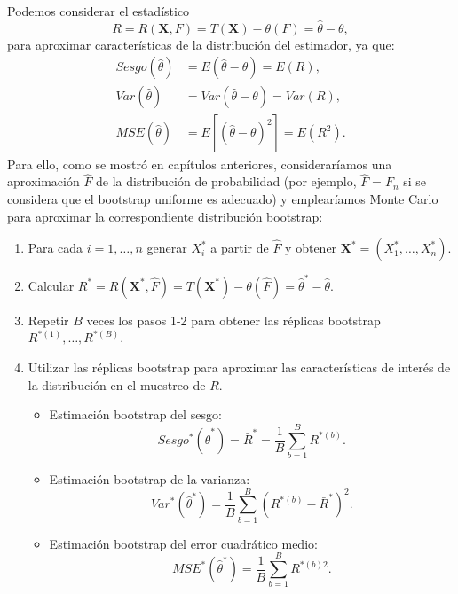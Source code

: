 \documentclass[
]{book}
\theoremstyle{break}
\theoremstyle{nonumberplain}
\begin{document}
Podemos considerar el estadístico
\[R=R\left( \mathbf{X}, F \right) = T\left( \mathbf{X} \right) - \theta \left( F \right) = \hat{\theta} - \theta,\]
para aproximar características de la distribución del estimador, ya que:
\[\begin{aligned}
Sesgo\left( \hat{\theta} \right) &= E\left( \hat{\theta}-\theta \right)
=E\left( R \right), \\
Var\left( \hat{\theta} \right) &= Var\left( \hat{\theta}-\theta \right)
=Var\left( R \right), \\
MSE\left( \hat{\theta} \right) &= E\left[ \left( \hat{\theta}-\theta \right)
^2\right] =E\left( R^2 \right).
\end{aligned}\]
Para ello, como se mostró en capítulos anteriores, consideraríamos una aproximación \(\hat{F}\) de la distribución de probabilidad (por ejemplo, \(\hat{F}=F_n\) si se considera que el bootstrap uniforme es adecuado) y emplearíamos Monte Carlo para aproximar la correspondiente distribución bootstrap:

\begin{enumerate}
\def\labelenumi{\arabic{enumi}.}
\item
  Para cada \(i=1,\ldots ,n\) generar \(X_i^{\ast}\) a partir de
  \(\hat{F}\) y obtener \(\mathbf{X}^{\ast}=\left( X_1^{\ast}, \ldots ,X_n^{\ast} \right)\).
\item
  Calcular \(R^{\ast}=R\left( \mathbf{X}^{\ast},\hat{F} \right) = T\left( \mathbf{X}^{\ast} \right) -\theta \left( \hat{F} \right) = \hat{\theta}^{\ast} - \hat{\theta}\).
\item
  Repetir \(B\) veces los pasos 1-2 para obtener las réplicas bootstrap
  \(R^{\ast (1)}, \ldots, R^{\ast (B)}\).
\item
  Utilizar las réplicas bootstrap para aproximar las características de interés de la distribución en el muestreo de \(R\).

  \begin{itemize}
  \item
    Estimación bootstrap del sesgo:
    \[Sesgo^{\ast}\left( \hat{\theta}^{\ast} \right) =\bar{R}^{\ast}=\frac{1}{B}\sum_{b=1}^{B}R^{\ast (b)}.\]
  \item
    Estimación bootstrap de la varianza:
    \[Var^{\ast}\left( \hat{\theta}^{\ast} \right) =\frac{1}{B} \sum_{b=1}^{B}\left( R^{\ast (b)}-\bar{R}^{\ast} \right)^2.\]
  \item
    Estimación bootstrap del error cuadrático medio:
    \[MSE^{\ast}\left( \hat{\theta}^{\ast} \right) =\frac{1}{B}\sum_{b=1}^{B}R^{\ast (b) 2}.\]
  \end{itemize}
\end{enumerate}
\end{document}
